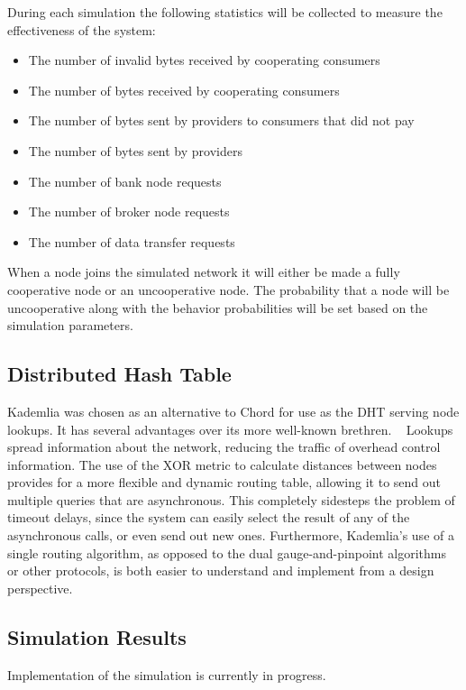 \documentclass[%
				10pt,
        final,
        notitlepage,
        narroweqnarray,
        inline,
        twoside,
        ]{ieee}
\begin{document}
During each simulation the following statistics will be collected to measure the effectiveness of the system:

\begin{itemize}
\item The number of invalid bytes received by cooperating consumers
\item The number of bytes received by cooperating consumers
\item The number of bytes sent by providers to consumers that did not pay
\item The number of bytes sent by providers
\item The number of bank node requests
\item The number of broker node requests
\item The number of data transfer requests
\end{itemize}

When a node joins the simulated network it will either be made a fully cooperative node or an uncooperative node.  The probability that a node will be uncooperative along with the behavior probabilities will be set based on the simulation parameters.

\subsection{Distributed Hash Table}
Kademlia was chosen as an alternative to Chord for use as the DHT serving node 
lookups.  It has several advantages over its more well-known brethren. 
~\cite{maymounkov} Lookups spread information about the network, reducing the 
traffic of overhead control information.  The use of the XOR metric to 
calculate distances between nodes provides for a more flexible and dynamic 
routing table, allowing it to send out multiple queries that are asynchronous.  
This completely sidesteps the problem of timeout delays, since the system can 
easily select the result of any of the asynchronous calls, or even send out new 
ones.  Furthermore, Kademlia's use of a single routing algorithm, as opposed to 
the dual gauge-and-pinpoint algorithms or other protocols, is both easier to 
understand and implement from a design perspective.


\subsection{Simulation Results}
Implementation of the simulation is currently in progress.
\end{document}

